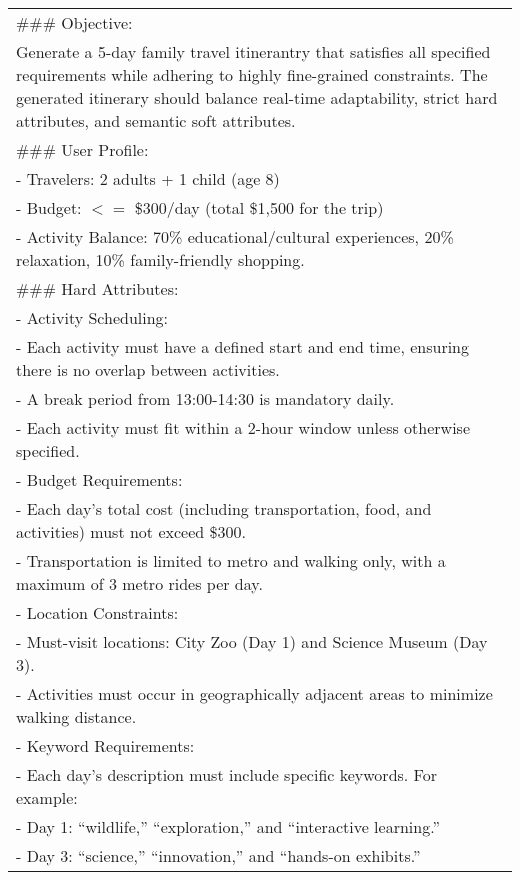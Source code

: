 
\begin{table*}[htbp]
    \centering
    \small
    \begin{tabular}{p{14cm}}
     \toprule
\#\#\#  Objective: \\
Generate a 5-day family travel itinerantry that satisfies all specified requirements while adhering to highly fine-grained constraints. The generated itinerary should balance real-time adaptability, strict hard attributes, and semantic soft attributes. \\

\#\#\# User Profile: \\
 - Travelers: 2 adults + 1 child (age 8) \\
 - Budget: $<=$ \$300/day (total \$1,500 for the trip) \\
 - Activity Balance: 70\% educational/cultural experiences, 20\% relaxation, 10\% family-friendly shopping. \\

\#\#\# Hard Attributes: \\
- Activity Scheduling: \\
\quad- Each activity must have a defined start and end time, ensuring there is no overlap between activities. \\
\quad- A break period from 13:00-14:30 is mandatory daily. \\
\quad- Each activity must fit within a 2-hour window unless otherwise specified. \\

- Budget Requirements: \\
\quad- Each day’s total cost (including transportation, food, and activities) must not exceed \$300. \\
\quad- Transportation is limited to metro and walking only, with a maximum of 3 metro rides per day. \\

- Location Constraints: \\
\quad- Must-visit locations: City Zoo (Day 1) and Science Museum (Day 3). \\
\quad- Activities must occur in geographically adjacent areas to minimize walking distance. \\

- Keyword Requirements: \\
\quad- Each day’s description must include specific keywords. For example: \\
\quad- Day 1: “wildlife,” “exploration,” and “interactive learning.” \\
\quad- Day 3: “science,” “innovation,” and “hands-on exhibits.” \\


\end{tabular}
\end{table*}
